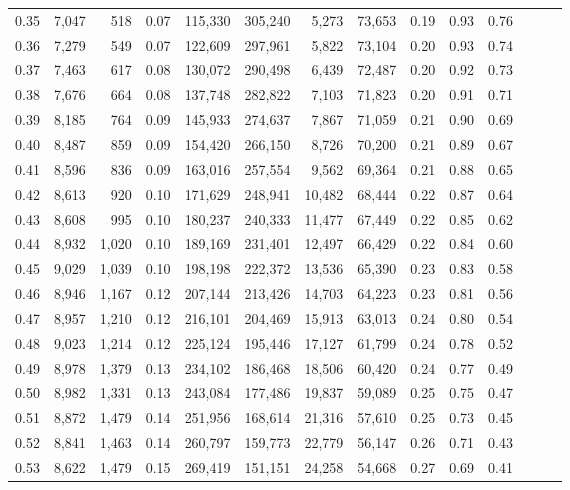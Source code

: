 \begin{tabular}{rrrrrrrrrrrrrr}
0.35 &  7,047 &    518 &  0.07 &  115,330 &  305,240 &   5,273 &  73,653 &  0.19 &  0.93 &      0.76 \\
0.36 &  7,279 &    549 &  0.07 &  122,609 &  297,961 &   5,822 &  73,104 &  0.20 &  0.93 &      0.74 \\
0.37 &  7,463 &    617 &  0.08 &  130,072 &  290,498 &   6,439 &  72,487 &  0.20 &  0.92 &      0.73 \\
0.38 &  7,676 &    664 &  0.08 &  137,748 &  282,822 &   7,103 &  71,823 &  0.20 &  0.91 &      0.71 \\
0.39 &  8,185 &    764 &  0.09 &  145,933 &  274,637 &   7,867 &  71,059 &  0.21 &  0.90 &      0.69 \\
0.40 &  8,487 &    859 &  0.09 &  154,420 &  266,150 &   8,726 &  70,200 &  0.21 &  0.89 &      0.67 \\
0.41 &  8,596 &    836 &  0.09 &  163,016 &  257,554 &   9,562 &  69,364 &  0.21 &  0.88 &      0.65 \\
0.42 &  8,613 &    920 &  0.10 &  171,629 &  248,941 &  10,482 &  68,444 &  0.22 &  0.87 &      0.64 \\
0.43 &  8,608 &    995 &  0.10 &  180,237 &  240,333 &  11,477 &  67,449 &  0.22 &  0.85 &      0.62 \\
0.44 &  8,932 &  1,020 &  0.10 &  189,169 &  231,401 &  12,497 &  66,429 &  0.22 &  0.84 &      0.60 \\
0.45 &  9,029 &  1,039 &  0.10 &  198,198 &  222,372 &  13,536 &  65,390 &  0.23 &  0.83 &      0.58 \\
0.46 &  8,946 &  1,167 &  0.12 &  207,144 &  213,426 &  14,703 &  64,223 &  0.23 &  0.81 &      0.56 \\
0.47 &  8,957 &  1,210 &  0.12 &  216,101 &  204,469 &  15,913 &  63,013 &  0.24 &  0.80 &      0.54 \\
0.48 &  9,023 &  1,214 &  0.12 &  225,124 &  195,446 &  17,127 &  61,799 &  0.24 &  0.78 &      0.52 \\
0.49 &  8,978 &  1,379 &  0.13 &  234,102 &  186,468 &  18,506 &  60,420 &  0.24 &  0.77 &      0.49 \\
0.50 &  8,982 &  1,331 &  0.13 &  243,084 &  177,486 &  19,837 &  59,089 &  0.25 &  0.75 &      0.47 \\
0.51 &  8,872 &  1,479 &  0.14 &  251,956 &  168,614 &  21,316 &  57,610 &  0.25 &  0.73 &      0.45 \\
0.52 &  8,841 &  1,463 &  0.14 &  260,797 &  159,773 &  22,779 &  56,147 &  0.26 &  0.71 &      0.43 \\
0.53 &  8,622 &  1,479 &  0.15 &  269,419 &  151,151 &  24,258 &  54,668 &  0.27 &  0.69 &      0.41 \\

\end{tabular}
